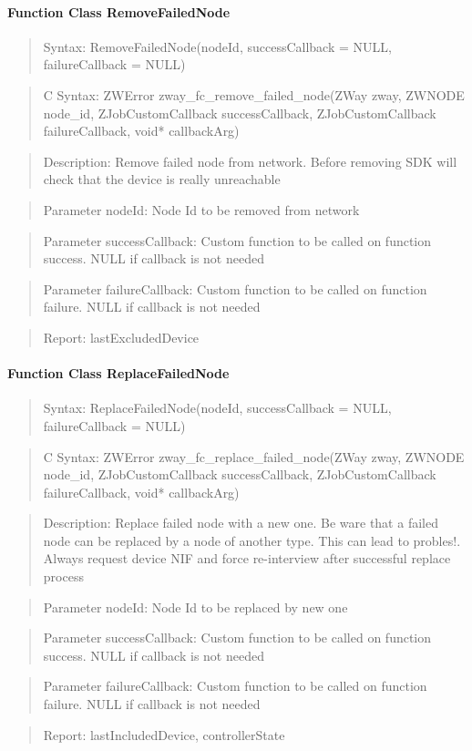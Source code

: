 \paragraph{Function Class RemoveFailedNode}
\begin{quote}Syntax: RemoveFailedNode(nodeId, successCallback = NULL, failureCallback = NULL)\end{quote}
\begin{quote}C Syntax: ZWError zway\_fc\_remove\_failed\_node(ZWay zway, ZWNODE node\_id, ZJobCustomCallback successCallback, ZJobCustomCallback failureCallback, void* callbackArg)\end{quote}
\begin{quote}Description: Remove failed node from network. Before removing SDK will check that the device is really unreachable\end{quote}
\begin{quote}Parameter nodeId: Node Id to be removed from network\end{quote}
\begin{quote}Parameter successCallback: Custom function to be called on function success. NULL if callback is not needed\end{quote}
\begin{quote}Parameter failureCallback: Custom function to be called on function failure. NULL if callback is not needed\end{quote}
\begin{quote}Report: lastExcludedDevice\end{quote}

\paragraph{Function Class ReplaceFailedNode}
\begin{quote}Syntax: ReplaceFailedNode(nodeId, successCallback = NULL, failureCallback = NULL)\end{quote}
\begin{quote}C Syntax: ZWError zway\_fc\_replace\_failed\_node(ZWay zway, ZWNODE node\_id, ZJobCustomCallback successCallback, ZJobCustomCallback failureCallback, void* callbackArg)\end{quote}
\begin{quote}Description: Replace failed node with a new one. Be ware that a failed node can be replaced by a node of another type. This can lead to probles!. Always request device NIF and force re-interview after successful replace process\end{quote}
\begin{quote}Parameter nodeId: Node Id to be replaced by new one\end{quote}
\begin{quote}Parameter successCallback: Custom function to be called on function success. NULL if callback is not needed\end{quote}
\begin{quote}Parameter failureCallback: Custom function to be called on function failure. NULL if callback is not needed\end{quote}
\begin{quote}Report: lastIncludedDevice, controllerState\end{quote}

